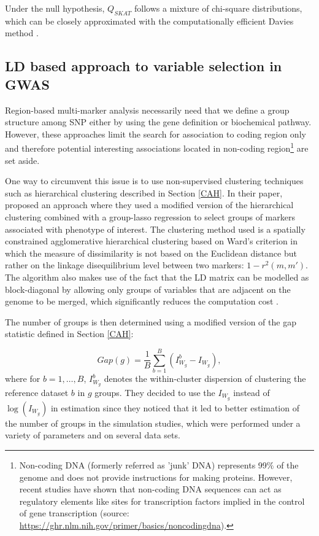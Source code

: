 \documentclass[]{book}
\begin{document}
Under the null hypothesis, \(Q_{SKAT}\) follows a mixture of chi-square
distributions, which can be closely approximated with the
computationally efficient Davies method \citep{davies1980algorithm}.

\hypertarget{adjclust}{%
\subsection{LD based approach to variable selection in GWAS}\label{adjclust}}

Region-based multi-marker analysis necessarily need that we define a
group structure among SNP either by using the gene definition or
biochemical pathway. However, these approaches limit the search for
association to coding region only and therefore potential interesting
associations located in non-coding region\footnote{Non-coding DNA (formerly referred as 'junk' DNA) represents 99\(\%\)
  of the genome and does not provide instructions for making proteins.
  However, recent studies have shown that non-coding DNA sequences can
  act as regulatory elements like sites for transcription factors
  implied in the control of gene transcription (source:
  \url{https://ghr.nlm.nih.gov/primer/basics/noncodingdna}).} are set aside.

One way to circumvent this issue is to use non-supervised clustering
techniques such as hierarchical clustering described in Section
\ref{CAH}. In their paper, \citep{dehman_performance_2015} proposed an
approach where they used a modified version of the hierarchical
clustering combined with a group-lasso regression to select groups of
markers associated with phenotype of interest. The clustering method
used is a spatially constrained agglomerative hierarchical clustering
based on Ward's criterion in which the measure of dissimilarity is not
based on the Euclidean distance but rather on the linkage disequilibrium
level between two markers: \(1 - r^2(m,m')\). The algorithm also makes use
of the fact that the LD matrix can be modelled as block-diagonal by
allowing only groups of variables that are adjacent on the genome to be
merged, which significantly reduces the computation cost \citep[\emph{adjclust},][]{dehman:tel-01288568}.

The number of groups is then determined using a modified version of the
gap statistic defined in Section \ref{CAH}:

\[Gap(g) = \frac{1}{B} \sum_{b=1}^B(I_{W_g}^b - I_{W_g}),\] where for
\(b = 1,\dots,B\), \(I_{W_g}^b\) denotes the within-cluster dispersion of
clustering the reference dataset \(b\) in \(g\) groups. They decided to use
the \(I_{W_g}\) instead of \(\log(I_{W_g})\) in estimation since they
noticed that it led to better estimation of the number of groups in the
simulation studies, which were performed under a variety of parameters
and on several data sets.
\end{document}
